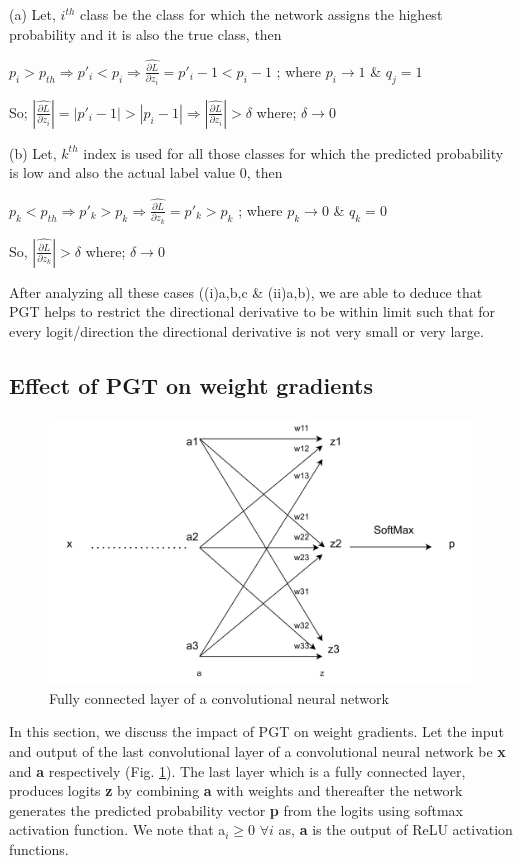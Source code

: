 \documentclass[times,sort&compress]{elsarticle}
\begin{document}
(a) Let, $i^{th}$ class be the class for which the network assigns the highest
probability and it is also the true class, then

$p_i > p_{th} \Rightarrow p'_i < p_i \Rightarrow \widehat{\frac{\partial L}{\partial
z_i}} = p'_i -1 <  p_i -1 $ ; where $p_i\rightarrow 1$ \& $q_j = 1$

So; $|\widehat{\frac{\partial L}{\partial z_i}}| = |p'_i -1| >  |p_i -1|  \Rightarrow
|\widehat{\frac{\partial L}{\partial z_i}}| >\delta $ where; $\delta\rightarrow 0$

(b) Let, $k^{th}$ index is used for all those classes for which the predicted
probability is low and also the actual label value $0$, then

$p_k < p_{th} \Rightarrow p'_k > p_k \Rightarrow \widehat{\frac{\partial L}{\partial
z_k}} = p'_k >  p_k$ ; where $p_k\rightarrow 0$ \& $q_k = 0$

So, $|\widehat{\frac{\partial L}{\partial z_k}}| >\delta$ where; $\delta\rightarrow 0$

After analyzing all these cases ((i)a,b,c \& (ii)a,b), we are able to deduce that PGT
helps to restrict the directional derivative to be within limit such that for every
logit/direction the directional derivative is not very small or very large. 

\subsection{Effect of PGT on weight gradients}
\label{sec:pgt_weight_gradients}

\begin{figure}[t]
\centering
\includegraphics[scale=1.0,width=0.5\columnwidth]{simplenn.jpg}
\caption{Fully connected layer of a convolutional neural network} 
\label{fig:simplenn}
\end{figure} 




In this section, we discuss the impact of PGT on weight gradients. Let the input and
output of the last convolutional layer of a convolutional neural network be \textbf{x}
and \textbf{a} respectively (Fig. \ref{fig:simplenn}). The last layer which is a fully
connected layer, produces logits \textbf{z} by combining \textbf{a} with weights and
thereafter the network generates the predicted probability vector \textbf{p} from the
logits using softmax activation function. We note that a$_i \geq 0$ $ \forall i$  as,
\textbf{a} is the output of ReLU activation functions.
\end{document}
